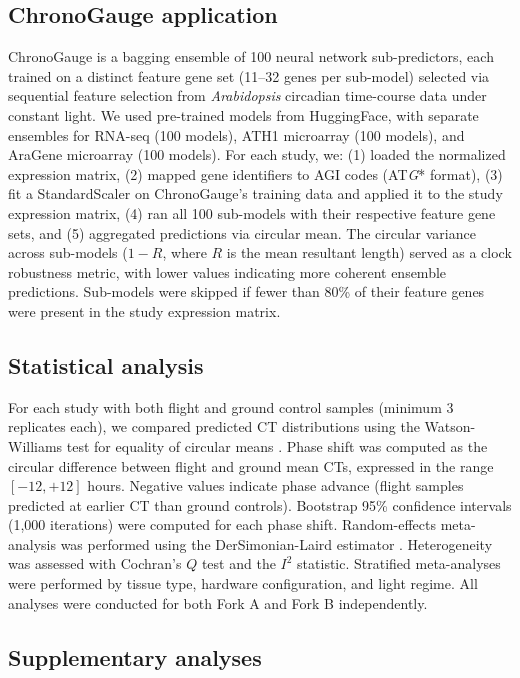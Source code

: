 \documentclass[11pt,a4paper]{article}
\begin{document}
\subsection*{ChronoGauge application}

ChronoGauge \citep{Reynolds2025} is a bagging ensemble of 100 neural network sub-predictors, each trained on a distinct feature gene set (11--32 genes per sub-model) selected via sequential feature selection from \textit{Arabidopsis} circadian time-course data under constant light. We used pre-trained models from HuggingFace, with separate ensembles for RNA-seq (100 models), ATH1 microarray (100 models), and AraGene microarray (100 models). For each study, we: (1) loaded the normalized expression matrix, (2) mapped gene identifiers to AGI codes (AT\textit{G}* format), (3) fit a StandardScaler on ChronoGauge's training data and applied it to the study expression matrix, (4) ran all 100 sub-models with their respective feature gene sets, and (5) aggregated predictions via circular mean. The circular variance across sub-models ($1 - R$, where $R$ is the mean resultant length) served as a clock robustness metric, with lower values indicating more coherent ensemble predictions. Sub-models were skipped if fewer than 80\% of their feature genes were present in the study expression matrix.

\subsection*{Statistical analysis}

For each study with both flight and ground control samples (minimum 3 replicates each), we compared predicted CT distributions using the Watson-Williams test for equality of circular means \citep{Watson1956}. Phase shift was computed as the circular difference between flight and ground mean CTs, expressed in the range $[-12, +12]$ hours. Negative values indicate phase advance (flight samples predicted at earlier CT than ground controls). Bootstrap 95\% confidence intervals (1,000 iterations) were computed for each phase shift. Random-effects meta-analysis was performed using the DerSimonian-Laird estimator \citep{DerSimonian1986}. Heterogeneity was assessed with Cochran's $Q$ test and the $I^2$ statistic. Stratified meta-analyses were performed by tissue type, hardware configuration, and light regime. All analyses were conducted for both Fork A and Fork B independently.

\subsection*{Supplementary analyses}
\end{document}
